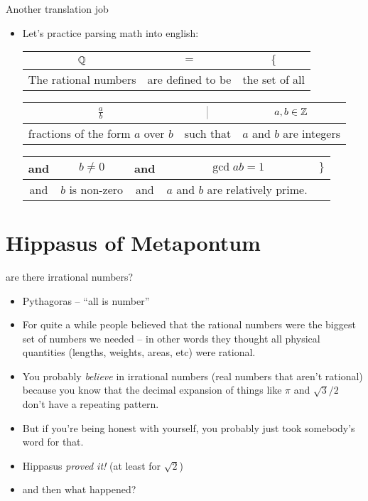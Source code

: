 \documentclass[landscape]{beamer}
\begin{document}
\begin{frame}{Another translation job}
\begin{itemize}
\item Let's practice parsing math into english: \pause

\vspace{.2in}

\begin{tabular}{c|c|c}
\rule[-10pt]{0pt}{22pt} ${\mathbb Q}$ & $=$ & $\{$  \\ \hline
\rule[-6pt]{0pt}{22pt} The rational numbers & are defined to be & the set of all\\
\end{tabular}

\vspace{.2in}

\begin{tabular}{c|c|c}
\rule[-10pt]{0pt}{22pt} $\displaystyle \frac{a}{b}$ & $\suchthat$ & $a,b \in {\mathbb Z}$ \\ \hline
\rule[-6pt]{0pt}{22pt} fractions of the form $a$ over $b$ & such that
& $a$ and $b$ are integers \\
\end{tabular}

\vspace{.2in}

\begin{tabular}{c|c|c|c|c}
\rule[-10pt]{0pt}{22pt} and & $b \neq 0$ & and & $\gcd{a}{b}=1$ & $\}$
\\ \hline
\rule[-6pt]{0pt}{22pt}  and & $b$ is non-zero & and & $a$ and $b$ are relatively prime. &  \\
\end{tabular}

\end{itemize}
\end{frame}

\section{Hippasus of Metapontum}


\begin{frame}{are there irrational numbers?}
\begin{itemize}
\item Pythagoras -- ``all is number'' \pause
\item For quite a while people believed that the rational numbers were the biggest set of numbers we needed -- in other words they thought all physical quantities (lengths, weights, areas, etc) were rational.\pause
\item You probably {\em believe} in irrational numbers (real numbers that aren't rational) because you know that the decimal expansion of things like $\pi$ and $\sqrt{3}/2$ don't have a repeating pattern. \pause
\item But if you're being honest with yourself, you probably just took somebody's word for that.\pause
\item Hippasus {\em proved it!} (at least for $\sqrt{2}$) \pause
\item and then what happened?
\end{itemize}
\end{frame}
\end{document}
